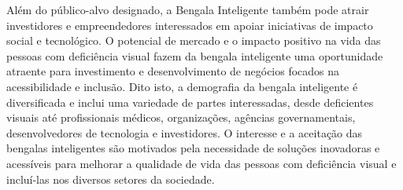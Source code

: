 Além do público-alvo designado, a Bengala Inteligente também pode atrair investidores e empreendedores interessados em apoiar iniciativas de impacto social e tecnológico. O potencial de mercado e o impacto positivo na vida das pessoas com deficiência visual fazem da bengala inteligente uma oportunidade atraente para investimento e desenvolvimento de negócios focados na acessibilidade e inclusão.
Dito isto, a demografia da bengala inteligente é diversificada e inclui uma variedade de partes interessadas, desde deficientes visuais até profissionais médicos, organizações, agências governamentais, desenvolvedores de tecnologia e investidores. O interesse e a aceitação das bengalas inteligentes são motivados pela necessidade de soluções inovadoras e acessíveis para melhorar a qualidade de vida das pessoas com deficiência visual e incluí-las nos diversos setores da sociedade.



